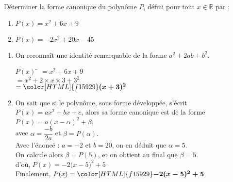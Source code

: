 \documentclass[a4paper,11pt,exos]{nsi} %
\begin{document}
\maketitle




\begin{exercice}
    Déterminer la forme canonique du polynôme $P$, défini pour tout $x \in \mathbb{R}$ par : 
    \begin{multicols}{2}
        \begin{enumerate}
            \item $P(x)=x^2+6x+9$
            \item $P(x)=-2x^2+20x-45$
        \end{enumerate}
    \end{multicols}
\end{exercice}



\begin{enumerate}[itemsep=1em]
    \item On reconnaît une identité remarquable de la forme $a^2+2ab+b^2$.
    \begin{tabbing}
        $P(x)$  \=  $=x^2+6x+9$\\
        \>  $=x^2+2\times x\times 3 +3^2$\\
        \>  $=\color[HTML]{f15929}\boldsymbol{(x+3)^2}$
    \end{tabbing}
    \item On sait que si le polynôme, sous forme développée, s'écrit $P(x)=ax^2+bx+c$, alors sa forme canonique est de la forme $P(x)=a(x-\alpha)^2+\beta$,\\avec $\alpha=\dfrac{-b}{2a}$ et $\beta=P(\alpha).$\\Avec l'énoncé : $a=-2$ et $b=20$, on en déduit que $\alpha=5$.\\On calcule alors $\beta=P(5)$, et on obtient au final que $\beta=5$.\\d'où, $P(x)=-2\big(x-5\big)^2+5$\\Finalement, $P(x)={\color[HTML]{f15929}\boldsymbol{-2(x -5)^2+5}}$
\end{enumerate}
    
    
\end{document}

